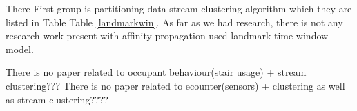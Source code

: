 \documentclass[../UNBThesis2.tex]{subfiles}
\begin{document}
\begin{itemize}[leftmargin=*]








\end{itemize}



There First group is partitioning data stream clustering algorithm which they are listed in Table Table \ref{landmarkwin}. As far as we had research, there is not any research work present with affinity propagation used landmark time window model.

There is no paper related to occupant behaviour(stair usage) + stream clustering???
There is no paper related to ecounter(sensors) + clustering as well as stream clustering????
\end{document}
